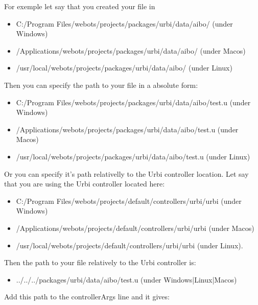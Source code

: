 For exemple let say that you created your file in
\begin{itemize}

\item C:/Program Files/webots/projects/packages/urbi/data/aibo/ (under
  Windows)



\item /Applications/webots/projects/packages/urbi/data/aibo/ (under
  Macos)



\item /usr/local/webots/projects/packages/urbi/data/aibo/ (under
  Linux)


\end{itemize}
        Then you can specify the path to your file in a absolute form:
 \begin{itemize}

\item   C:/Program Files/webots/projects/packages/urbi/data/aibo/test.u (under Windows)



\item   /Applications/webots/projects/packages/urbi/data/aibo/test.u (under Macos)



\item   /usr/local/webots/projects/packages/urbi/data/aibo/test.u (under Linux)


\end{itemize}
       Or you can specify it's path relativelly to the Urbi controller location.
      Let say that you are using the Urbi controller located here:
 \begin{itemize}

\item   C:/Program Files/webots/projects/default/controllers/urbi/urbi (under Windows)



\item   /Applications/webots/projects/default/controllers/urbi/urbi (under Macos)



\item   /usr/local/webots/projects/default/controllers/urbi/urbi (under Linux).


\end{itemize}
       Then the path to your file relatively to the Urbi controller is:
 \begin{itemize}

\item   ../../../packages/urbi/data/aibo/test.u (under Windows|Linux|Macos)


\end{itemize}
         Add this path to the controllerArgs line and it gives:


